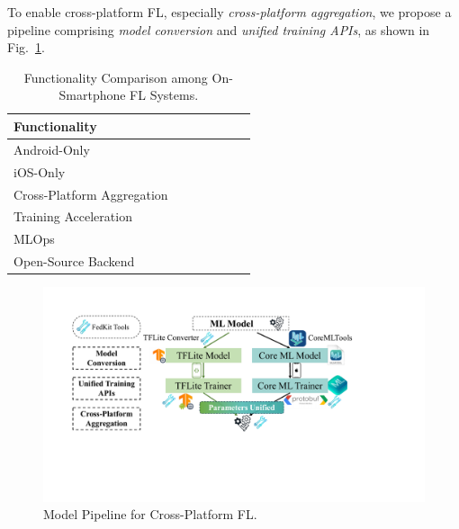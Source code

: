 \documentclass[conference]{IEEEtran}
\begin{document}
To enable cross-platform FL,
especially \textit{cross-platform aggregation},
we propose a pipeline comprising
\textit{model conversion} and
\textit{unified training APIs},
as shown in Fig.~\ref{cross_fl}.

\begin{table}
    \centering
    \newcommand{\Ys}{\ding{51}}
    \newcommand{\No}{\ding{55}}
\begin{tabular}{lcccccc}
Functionality               & \cite{he2020fedml}
                                    & \cite{madrigal2023project}
                                            & \cite{mathur2021ondevice}
                                                    & \cite{hall2021syft}
                                                            & \FedKit{}\\
\hline
Android-Only                & \Ys   & \Ys   & \Ys   & \Ys   & \Ys   \\
iOS-Only                    & \No   & \No   & \Ys   & \Ys   & \Ys   \\
Cross-Platform Aggregation  & \No   & \No   & \No   & \Ys   & \Ys   \\\hline
Training Acceleration       & \Ys   & \Ys   & \Ys   & \No   & \Ys   \\
MLOps                       & \Ys   & \Ys   & \No   & \No   & \Ys   \\
Open-Source Backend         & \No   & \No   & \Ys   & \Ys   & \Ys   \\
\end{tabular}
\caption{Functionality Comparison among On-Smartphone FL Systems.}
\label{tbl:fn-systems}
\end{table}

\begin{figure}
    \centering
    \includegraphics*[width=\linewidth]{model_pipeline.pdf}
    \caption{\FedKit{} Model Pipeline for Cross-Platform FL.}
    \label{cross_fl}
\end{figure}
\end{document}
